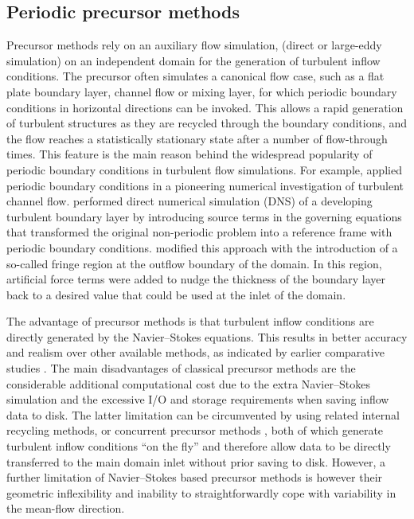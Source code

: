 	\subsection{Periodic precursor methods}
	Precursor methods rely on an auxiliary flow simulation, (direct or large-eddy simulation) on an independent domain for the generation of turbulent inflow conditions.
	The precursor often simulates a canonical flow case, such as a flat plate boundary layer, channel flow or mixing layer, for which periodic
	boundary conditions in horizontal directions can be invoked. This allows a rapid generation of turbulent structures as they are recycled
	through the boundary conditions, and the flow reaches a statistically stationary state after a number of flow-through times. This feature is
	the main reason behind the widespread popularity of periodic boundary conditions in turbulent flow simulations. For example, \cite{kimmoin} applied
	periodic boundary conditions in a pioneering numerical investigation of turbulent channel flow. \cite{spalart1988direct} performed direct numerical simulation (DNS) of a developing turbulent boundary layer by introducing source terms in the governing equations that transformed the original non-periodic problem into a reference frame with periodic boundary conditions.  \cite{spalart1993experimental} modified this approach with the introduction of a so-called fringe region at the outflow boundary of the domain. In this region, artificial force terms were added to nudge the thickness of the boundary layer back to a desired value that could be used at the inlet of the domain.
	
	The advantage of precursor methods is that turbulent inflow conditions are directly generated by the Navier--Stokes equations. This results in
	better accuracy and realism over other available methods, as indicated by earlier comparative studies  \citep{keating2004priori,
	tabor2010inlet}. The main disadvantages of classical precursor methods are the considerable additional computational cost due to the extra
	Navier--Stokes simulation and the excessive I/O and storage requirements when saving inflow data to disk. The latter limitation can be
	circumvented by using related internal recycling methods, \cite[see,
	e.g.,][]{lund1998generation,mayor2002application,ferrante2004robust,araya2009inlet,araya2011dynamic} or concurrent precursor methods
	\citep{stevens2014large,stevens2014concurrent}, both of which generate turbulent inflow conditions ``on the fly'' and therefore allow data to
	be directly transferred to the main domain inlet without prior saving to disk. However, a further limitation of Navier--Stokes based precursor methods is however their geometric inflexibility and inability to straightforwardly cope with variability in the mean-flow direction. 
	

